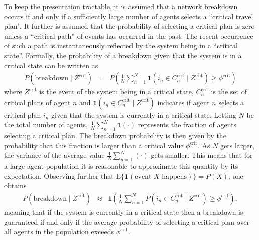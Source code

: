 To keep the presentation tractable, it is assumed that a network breakdown
occurs if and only if a sufficiently large number of agents selects
a {}``critical travel plan''. It further is assumed that the probability
of selecting a critical plan is zero unless a {}``critical path''
of events has occurred in the past. The recent occurrence of such
a path is instantaneously reflected by the system being in a {}``critical
state''. Formally, the probability of a breakdown given that the
system is in a critical state can be written as
\begin{eqnarray}
P(\text{breakdown}\mid Z^{\text{crit}}) & = & P\left(\frac{1}{N}\sum_{n=1}^{N}\mathbf{1}(i_{n}\in C_{n}^{\text{crit}}\mid Z^{\text{crit}})\geq\phi^{\text{crit}}\right)
\end{eqnarray}
where $Z^{\text{crit}}$ is the event of the system being in a critical
state, $C_{n}^{\text{crit}}$ is the set of critical plans of agent
$n$ and $\mathbf{1}(i_{n}\in C_{n}^{\text{crit}}\mid Z^{\text{crit}})$
indicates if agent $n$ selects a critical plan $i_{n}$ given that
the system is currently in a critical state. Letting $N$ be the total
number of agents, $\frac{1}{N}\sum_{n=1}^{N}\mathbf{1}(\cdot)$ represents
the fraction of agents selecting a critical plan. The breakdown probability
is then given by the probability that this fraction is larger than
a critical value $\phi^{\text{crit}}$. As $N$ gets larger, the variance
of the average value $\frac{1}{N}\sum_{n=1}^{N}(\cdot)$ gets smaller.
This means that for a large agent population it is reasonable to approximate
this quantity by its expectation. Observing further that $\text{E}\{\mathbf{1}(\text{event }X\text{ happens})\}=P(X)$,
one obtains
\begin{eqnarray}
P(\text{breakdown}\mid Z^{\text{crit}}) & \approx & \mathbf{1}\left(\frac{1}{N}\sum_{n=1}^{N}P(i_{n}\in C_{n}^{\text{crit}}\mid Z^{\text{crit}})\geq\phi^{\text{crit}}\right),\label{eq:breakdown-indicator}
\end{eqnarray}
meaning that if the system is currently in a critical state then a
breakdown is guaranteed if and only if the average probability of
selecting a critical plan over all agents in the population exceeds
$\phi^{\text{crit}}$.

